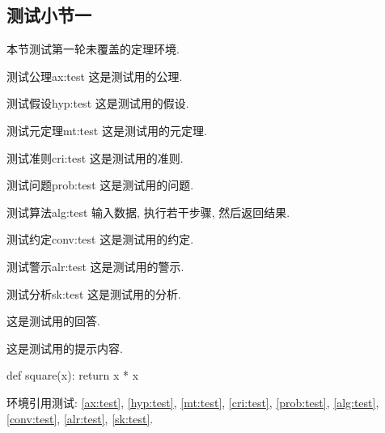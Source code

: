 \subsection{测试小节一}

本节测试第一轮未覆盖的定理环境.

\begin{axiom}{测试公理}{ax:test}
    这是测试用的公理.
\end{axiom}

\begin{hypothesis}{测试假设}{hyp:test}
    这是测试用的假设.
\end{hypothesis}

\begin{metatheorem}{测试元定理}{mt:test}
    这是测试用的元定理.
\end{metatheorem}

\begin{criteria}{测试准则}{cri:test}
    这是测试用的准则.
\end{criteria}

\begin{problem}{测试问题}{prob:test}
    这是测试用的问题.
\end{problem}

\begin{algorithm}{测试算法}{alg:test}
    输入数据, 执行若干步骤, 然后返回结果.
\end{algorithm}

\begin{convention}{测试约定}{conv:test}
    这是测试用的约定.
\end{convention}

\begin{alarm}{测试警示}{alr:test}
    这是测试用的警示.
\end{alarm}

\begin{sketch}{测试分析}{sk:test}
    这是测试用的分析.
\end{sketch}

\begin{answer}
    这是测试用的回答.
\end{answer}

\begin{hint}[测试提示]
    这是测试用的提示内容.
\end{hint}

\begin{code}[Python 测试]
def square(x):
    return x * x
\end{code}

环境引用测试: \autoref{ax:test}, \autoref{hyp:test}, \autoref{mt:test}, \autoref{cri:test}, \autoref{prob:test}, \autoref{alg:test}, \autoref{conv:test}, \autoref{alr:test}, \autoref{sk:test}.
